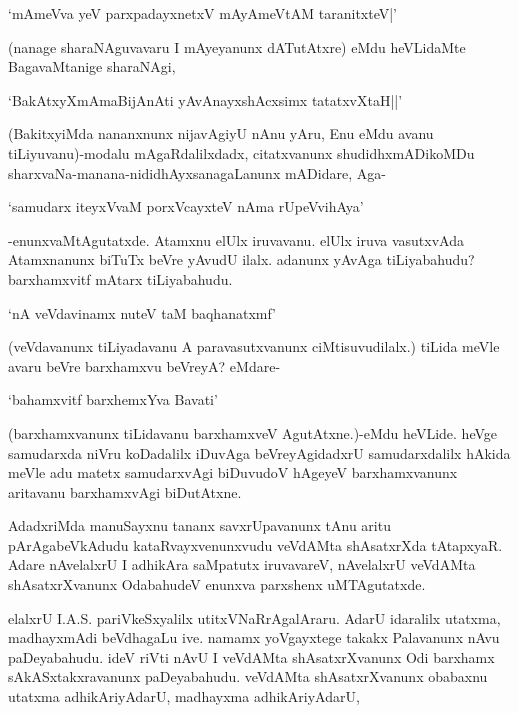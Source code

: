 \begin{shloka}
`mAmeVva yeV parxpadayxnetxV mAyAmeVtAM taranitxteV|'
\end{shloka}

(nanage sharaNAguvavaru I mAyeyanunx dATutAtxre) eMdu heVLidaMte BagavaMtanige sharaNAgi,

\begin{shloka}
`BakAtxyXmAmaBijAnAti yAvAnayxshAcxsimx tatatxvXtaH||'
\end{shloka}

(BakitxyiMda nananxnunx nijavAgiyU nAnu yAru, Enu eMdu avanu tiLiyuvanu)-modalu mAgaRdalilxdadx, citatxvanunx shudidhxmADikoMDu sharxvaNa-manana-nididhAyxsanagaLanunx mADidare, Aga-

\begin{shloka}
`samudarx iteyxVvaM porxVcayxteV nAma rUpeVvihAya'
\end{shloka}

-enunxvaMtAgutatxde. Atamxnu elUlx iruvavanu. elUlx iruva vasutxvAda Atamxnanunx biTuTx beVre yAvudU ilalx. adanunx yAvAga tiLiyabahudu? barxhamxvitf mAtarx tiLiyabahudu.

\begin{shloka}
`nA veVdavinamx nuteV taM baqhanatxmf'
\end{shloka}

(veVdavanunx tiLiyadavanu A paravasutxvanunx ciMtisuvudilalx.) tiLida meVle avaru beVre barxhamxvu beVreyA? eMdare-

\begin{shloka}
`bahamxvitf barxhemxYva Bavati'
\end{shloka}

(barxhamxvanunx tiLidavanu barxhamxveV AgutAtxne.)-eMdu heVLide. heVge samudarxda niVru koDadalilx iDuvAga beVreyAgidadxrU samudarxdalilx hAkida meVle adu matetx samudarxvAgi biDuvudoV hAgeyeV barxhamxvanunx aritavanu barxhamxvAgi biDutAtxne.

AdadxriMda manuSayxnu tananx savxrUpavanunx tAnu aritu pArAgabeVkAdudu kataRvayxvenunxvudu veVdAMta shAsatxrXda tAtapxyaR. Adare nAvelalxrU I adhikAra saMpatutx iruvavareV, nAvelalxrU veVdAMta shAsatxrXvanunx OdabahudeV enunxva parxshenx uMTAgutatxde.

elalxrU {\rm I.A.S.} pariVkeSxyalilx utitxVNaRrAgalAraru. AdarU idaralilx utatxma, madhayxmAdi beVdhagaLu ive. namamx yoVgayxtege takakx Palavanunx nAvu paDeyabahudu. ideV riVti nAvU I veVdAMta shAsatxrXvanunx Odi barxhamx sAkASxtakxravanunx paDeyabahudu. veVdAMta shAsatxrXvanunx obabaxnu utatxma adhikAriyAdarU, madhayxma adhikAriyAdarU,


